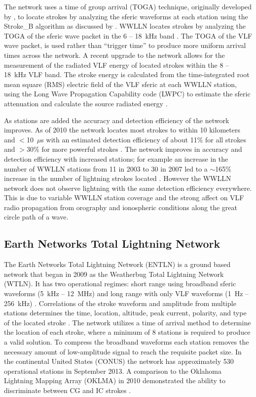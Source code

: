 The network uses a time of group arrival (TOGA) technique, originally developed by \citet{Dowden2002d}, to locate strokes by analyzing the sferic waveforms at each station using the Stroke\_B algorithm as discussed by \citet{Rodger2006,Rodger2009}.
WWLLN locates strokes by analyzing the TOGA of the sferic wave packet in the 6 -- 18~kHz band \citep{Dowden2000}.
The TOGA of the VLF wave packet, is used rather than ``trigger time'' to produce more uniform arrival times across the network.
A recent upgrade to the network allows for the measurement of the radiated VLF energy of located strokes within the 8 -- 18~kHz VLF band.
The stroke energy is calculated from the time-integrated root mean square (RMS) electric field of the VLF sferic at each WWLLN station, using the Long Wave Propagation Capability code (LWPC) \citep{Ferguson1998} to estimate the sferic attenuation and calculate the source radiated energy \citep{Hutchins2012}.

As stations are added the accuracy and detection efficiency of the network improves.
As of 2010 the network locates most strokes to within 10 kilometers and $<$10~$\mu$s with an estimated detection efficiency of about 11\% for all strokes and $>$30\% for more powerful strokes \citep{Abarca2010,Rodger2009}.
The network improves in accuracy and detection efficiency with increased stations; for example an increase in the number of WWLLN stations from 11 in 2003 to 30 in 2007 led to a $\sim$165\% increase in the number of lightning strokes located \citep{Rodger2009}.
However the WWLLN network does not observe lightning with the same detection efficiency everywhere.
This is due to variable WWLLN station coverage and the strong affect on VLF radio propagation from orography and ionospheric conditions along the great circle path of a wave.

\subsection{Earth Networks Total Lightning Network}


The Earth Networks Total Lightning Network (ENTLN) is a ground based network that began in 2009 as the Weatherbug Total Lightning Network (WTLN).
It has two operational regimes: short range using broadband sferic waveforms (5~kHz -- 12~MHz) and long range with only VLF waveforms (1~Hz -- 256~kHz) \citep{Heckman2010}.
Correlations of the stroke waveform and amplitude from multiple stations determines the time, location, altitude, peak current, polarity, and type of the located stroke \citep{Liu2011a}.
The network utilizes a time of arrival method to determine the location of each stroke, where a minimum of 8 stations is required to produce a valid solution.
To compress the broadband waveforms each station removes the necessary amount of low-amplitude signal to reach the requisite packet size.
In the continental United States (CONUS) the network has approximately 530 operational stations in September 2013.
A comparison to the Oklahoma Lightning Mapping Array (OKLMA) in 2010 demonstrated the ability to discriminate between CG and IC strokes \citep{Beasley2010}.

